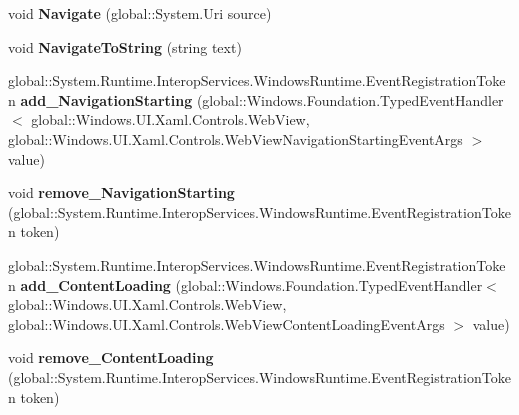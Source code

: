 \begin{DoxyCompactItemize}
\item 
\mbox{\label{class_windows_1_1_u_i_1_1_xaml_1_1_controls_1_1_web_view_afeb9191cdf8b05104415b2eea3c4a61e}} 
void {\bfseries Navigate} (global\+::\+System.\+Uri source)
\item 
\mbox{\label{class_windows_1_1_u_i_1_1_xaml_1_1_controls_1_1_web_view_a499af186643e5dd18801feb99ff90d1b}} 
void {\bfseries Navigate\+To\+String} (string text)
\item 
\mbox{\label{class_windows_1_1_u_i_1_1_xaml_1_1_controls_1_1_web_view_a361ed515c1004df57859facee7c40cff}} 
global\+::\+System.\+Runtime.\+Interop\+Services.\+Windows\+Runtime.\+Event\+Registration\+Token {\bfseries add\+\_\+\+Navigation\+Starting} (global\+::\+Windows.\+Foundation.\+Typed\+Event\+Handler$<$ global\+::\+Windows.\+U\+I.\+Xaml.\+Controls.\+Web\+View, global\+::\+Windows.\+U\+I.\+Xaml.\+Controls.\+Web\+View\+Navigation\+Starting\+Event\+Args $>$ value)
\item 
\mbox{\label{class_windows_1_1_u_i_1_1_xaml_1_1_controls_1_1_web_view_a238be27c68aeec48384e442cecf3b6c0}} 
void {\bfseries remove\+\_\+\+Navigation\+Starting} (global\+::\+System.\+Runtime.\+Interop\+Services.\+Windows\+Runtime.\+Event\+Registration\+Token token)
\item 
\mbox{\label{class_windows_1_1_u_i_1_1_xaml_1_1_controls_1_1_web_view_abafc86e0705f5bfc2a610d4e7db17e58}} 
global\+::\+System.\+Runtime.\+Interop\+Services.\+Windows\+Runtime.\+Event\+Registration\+Token {\bfseries add\+\_\+\+Content\+Loading} (global\+::\+Windows.\+Foundation.\+Typed\+Event\+Handler$<$ global\+::\+Windows.\+U\+I.\+Xaml.\+Controls.\+Web\+View, global\+::\+Windows.\+U\+I.\+Xaml.\+Controls.\+Web\+View\+Content\+Loading\+Event\+Args $>$ value)
\item 
\mbox{\label{class_windows_1_1_u_i_1_1_xaml_1_1_controls_1_1_web_view_a5238a1002352cbd9d9832c39806630dd}} 
void {\bfseries remove\+\_\+\+Content\+Loading} (global\+::\+System.\+Runtime.\+Interop\+Services.\+Windows\+Runtime.\+Event\+Registration\+Token token)

\end{DoxyCompactItemize}
